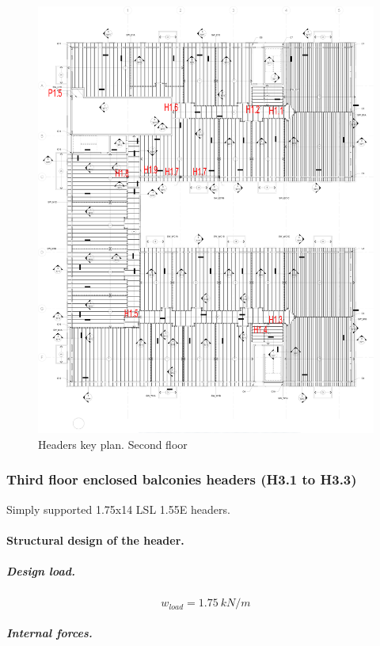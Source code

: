 \begin{figure}
  \begin{center}
  \includegraphics[width=120mm]{figures/headers_key_plan_2nd_floor}
  \end{center}
  \caption{Headers key plan. Second floor}\label{fg_headers_key_plan_2nd_floor}
\end{figure}

\subsubsection{Third floor enclosed balconies headers (H3.1 to H3.3)}
Simply supported 1.75x14 LSL 1.55E headers.

\paragraph{Structural design of the header.}

\subparagraph{Design load.}

\begin{equation}
  w_{load}= 1.75\ kN/m
\end{equation}

\subparagraph{Internal forces.}

